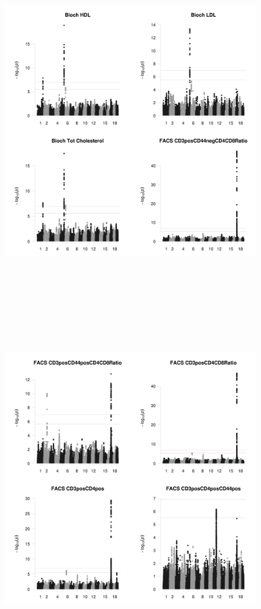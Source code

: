 \documentclass{article}
\begin{document}
\begin{figure}
\begin{center}
\includegraphics[width=15cm, height=15cm]{13.jpeg}
\end{center}
\end{figure}


\begin{figure}
\begin{center}
\includegraphics[width=15cm, height=15cm]{17.jpeg}
\end{center}
\end{figure}
\end{document}
